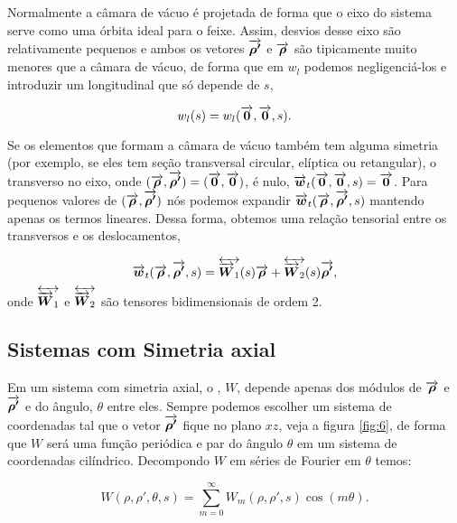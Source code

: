 Normalmente a câmara de vácuo é projetada de forma que o eixo do sistema serve como uma órbita ideal para o feixe. Assim, desvios desse eixo são relativamente pequenos e ambos os vetores $\overrightarrow{\boldsymbol{\rho'}}$ e $\overrightarrow{\boldsymbol{\rho}}$ são tipicamente muito menores que a câmara de vácuo, de forma que em $w_l$ podemos negligenciá-los e introduzir um  longitudinal que só depende de $s$,

\begin{equation}
	w_l(s) = w_l(\overrightarrow{\boldsymbol{0}},\overrightarrow{\boldsymbol{0}},s).
\end{equation}

Se os elementos que formam a câmara de vácuo também tem alguma simetria (por exemplo, se eles tem seção transversal circular, elíptica ou retangular), o  transverso no eixo, onde $(\overrightarrow{\boldsymbol{\rho}},\overrightarrow{\boldsymbol{\rho'}}) = (\overrightarrow{\boldsymbol{0}},\overrightarrow{\boldsymbol{0}})$, é nulo, $\overrightarrow{\boldsymbol{w}}_t(\overrightarrow{\boldsymbol{0}},\overrightarrow{\boldsymbol{0}},s)=\overrightarrow{\boldsymbol{0}}$. Para pequenos valores de $(\overrightarrow{\boldsymbol{\rho}},\overrightarrow{\boldsymbol{\rho'}})$ nós podemos expandir $\overrightarrow{\boldsymbol{w}}_t(\overrightarrow{\boldsymbol{\rho}},\overrightarrow{\boldsymbol{\rho'}},s)$ mantendo apenas os termos lineares. Dessa forma, obtemos uma relação tensorial entre os  transversos e os deslocamentos,

\begin{equation}
	\overrightarrow{\boldsymbol{w}}_t(\overrightarrow{\boldsymbol{\rho}},\overrightarrow{\boldsymbol{\rho'}},s) = \overleftrightarrow{\overrightarrow{\boldsymbol{W}}_1}(s)\overrightarrow{\boldsymbol{\rho}} +
    										 \overleftrightarrow{\overrightarrow{\boldsymbol{W}}_2}(s)\overrightarrow{\boldsymbol{\rho'}},
\end{equation}
onde $\overleftrightarrow{\overrightarrow{\boldsymbol{W}}_1}$ e $\overleftrightarrow{\overrightarrow{\boldsymbol{W}}_2}$ são tensores bidimensionais de ordem 2.

\subsection{Sistemas com Simetria axial}

Em um sistema com simetria axial, o , $W$, depende apenas dos módulos de $\overrightarrow{\boldsymbol{\rho}}$ e $\overrightarrow{\boldsymbol{\rho'}}$ e do ângulo, $\theta$ entre eles. Sempre podemos escolher um sistema de coordenadas tal que o vetor $\overrightarrow{\boldsymbol{\rho'}}$ fique no plano $xz$, veja a figura \ref{fig:6}, de forma que $W$ será uma função periódica e par  do ângulo $\theta$ em um sistema de coordenadas cilíndrico. Decompondo $W$ em séries de Fourier em $\theta$ temos:

\begin{equation}
	W(\rho,\rho',\theta,s) = \sum_{m=0}^\infty W_m (\rho,\rho',s) \cos(m\theta).
\end{equation}

